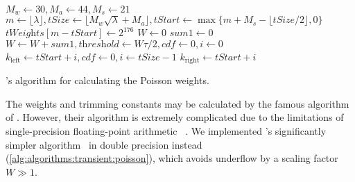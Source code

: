 \begin{algorithmpage}
  $M_w \gets 30, M_a \gets 44, M_s \gets 21$
  $m \gets \lfloor \lambda \rfloor, \textit{tSize} \gets \lfloor
  M_w \sqrt{\lambda} + M_a \rfloor, \textit{tStart} \gets \max
  \{m + M_s - \lfloor \textit{tSize} / 2 \rfloor, 0 \}$\;
  \;
  $\textit{tWeights}[m - \textit{tStart}] \gets 2^{176}$\;
  $W \gets 0$\;
  $\textit{sum1} \gets 0$
  $W \gets W + \textit{sum1}, \textit{threshold} \gets W \tau / 2,
  \textit{cdf} \gets 0, i \gets 0$\;
  $k_{\text{left}} \gets \textit{tStart} + i, \textit{cdf} \gets 0, i
  \gets \textit{tSize} - 1$\;
  $k_{\text{right}} \gets \textit{tStart} + i$\;
  \;
  \;
  \caption{\citeauthor{DBLP:journals/corr/Burak14}'s algorithm for
    calculating the Poisson weights.}
  \label{alg:algorithms:transient:poisson}
\end{algorithmpage}

The weights and trimming constants may be calculated by the famous
algorithm of \citet{DBLP:journals/cacm/FoxG88}. However, their
algorithm is extremely complicated due to the limitations of
single-precision floating-point arithmetic%
~\citep{jansen2011understanding}. We implemented
\citeauthor{DBLP:journals/corr/Burak14}'s significantly simpler
algorithm~\citep{DBLP:journals/corr/Burak14} in double precision
instead (\vref{alg:algorithms:transient:poisson}), which avoids
underflow by a scaling factor $W \gg 1$.

